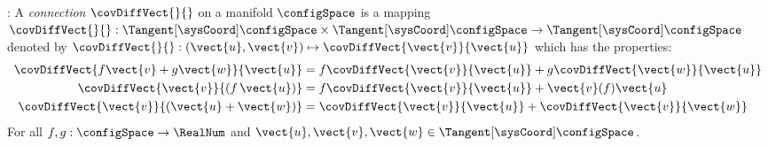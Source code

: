 \cite[Def.\,VII.3.1]{Boothby:DiffGeo}: A \textit{connection} $\covDiffVect{}{}$ on a manifold $\configSpace$ is a mapping $\covDiffVect{}{} : \Tangent[\sysCoord]\configSpace \times \Tangent[\sysCoord]\configSpace \rightarrow \Tangent[\sysCoord]\configSpace$
denoted by $\covDiffVect{}{} : (\vect{u}, \vect{v}) \mapsto \covDiffVect{\vect{v}}{\vect{u}}$ which has the properties:
\begin{subequations}
\begin{align}
 \label{eq:LeviCivitaLinear}
 \covDiffVect{f\vect{v}+g\vect{w}}{\vect{u}} &= f \covDiffVect{\vect{v}}{\vect{u}} + g \covDiffVect{\vect{w}}{\vect{u}}
\\
 \label{eq:LeviCivitaProduct}
 \covDiffVect{\vect{v}}{(f\,\vect{u})} &= f \covDiffVect{\vect{v}}{\vect{u}} + \vect{v}(f) \vect{u}
\\
 \covDiffVect{\vect{v}}{(\vect{u} + \vect{w})} &= \covDiffVect{\vect{v}}{\vect{u}} + \covDiffVect{\vect{v}}{\vect{w}}
\end{align}
\end{subequations}
For all $f,g : \configSpace \rightarrow \RealNum$ and $\vect{u}, \vect{v}, \vect{w} \in \Tangent[\sysCoord]\configSpace$.

